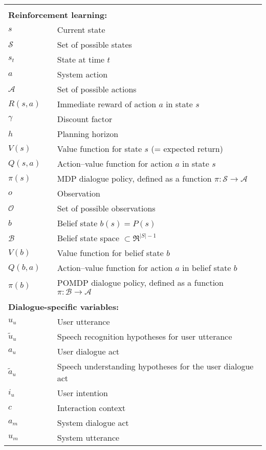 \begin{longtable}{lp{5mm}p{11cm}}
&&  \vspace{0mm} \\
\multicolumn{3}{l}{\textbf{Reinforcement learning:}} \vspace{2mm} \\
$s$ && Current state \\
$\mathcal{S}$ && Set of possible states \\
$s_t$ && State at time $t$ \\
$a$ && System action \\ 
$\mathcal{A}$ && Set of possible actions \\
$R(s,a)$ && Immediate reward of action $a$ in state $s$ \\
$\gamma$ && Discount factor \\
$h$ && Planning horizon \\
$V(s)$ && Value function for state $s$ (= expected return) \\
$Q(s,a)$ && Action--value function for action $a$ in state $s$  \\
$\pi(s)$ && MDP dialogue policy, defined as a function $\pi: \mathcal{S} \rightarrow \mathcal{A} $ \\
$o$ && Observation \\
$\mathcal{O}$ && Set of possible observations \\
$b$ && Belief state $b(s) = P(s)$ \\
$\mathcal{B}$ && Belief state space $\subset \Re^{|S|-1}$ \\
$V(b)$ && Value function for belief state $b$  \\
$Q(b,a)$ && Action--value function for action $a$ in belief state $b$ \\
$\pi(b)$ && POMDP dialogue policy, defined as a function $\pi: \mathcal{B} \rightarrow \mathcal{A} $ \\


&&  \vspace{3mm} \\
\multicolumn{3}{l}{\textbf{Dialogue-specific variables:}} \vspace{2mm} \\

$u_u$ && User utterance \\
$\tilde{u}_u$ && Speech recognition hypotheses for user utterance \\
$a_u$ && User dialogue act \\
$\tilde{a}_u$ && Speech understanding hypotheses for the user dialogue act \\
$i_u$ && User intention \\
$c$ && Interaction context \\
$a_m$ && System dialogue act \\
$u_m$ && System utterance \\


\end{longtable}
